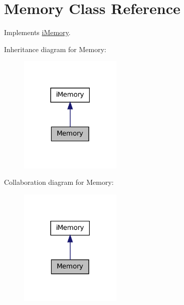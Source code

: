 \hypertarget{classMemory}{
\section{Memory Class Reference}
\label{classMemory}
}


Implements \hyperlink{classiMemory}{iMemory}.  




Inheritance diagram for Memory:
\nopagebreak
\begin{figure}[H]
\begin{center}
\leavevmode
\includegraphics[width=138pt]{classMemory__inherit__graph}
\end{center}
\end{figure}


Collaboration diagram for Memory:
\nopagebreak
\begin{figure}[H]
\begin{center}
\leavevmode
\includegraphics[width=138pt]{classMemory__coll__graph}
\end{center}
\end{figure}
